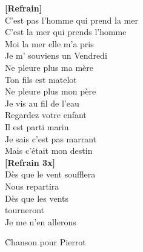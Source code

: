 \documentclass{novel}
\begin{document}
\begin{multicols}{3}
\textbf{[Refrain]} \\

C'est pas l'homme qui prend la mer \\
C'est la mer qui prends l'homme \\
Moi la mer elle m'a pris \\
Je m' souviens un Vendredi \\
Ne pleure plus ma mère \\
Ton fils est matelot \\
Ne pleure plus mon père \\
Je vis au fil de l'eau \\
Regardez votre enfant \\
Il est parti marin \\
Je sais c'est pas marrant \\
Mais c'était mon destin \\

\textbf{[Refrain 3x]} \\

Dès que le vent soufflera \\
Nous repartira \\
Dès que les vents \\
tourneront \\
Je me n'en allerons \\
\end{multicols}


\newpage
\normalsize

\h*{Chanson pour Pierrot}
\end{document}
